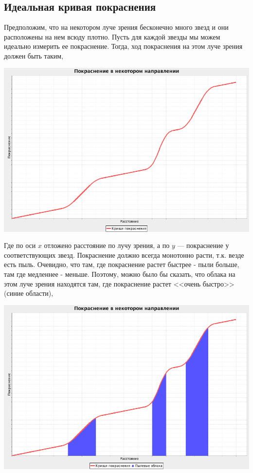 \documentclass[14pt]{article}
\begin{document}
        \subsection{Идеальная кривая покраснения}
            Предположим, что на некотором луче зрения бесконечно много звезд и они расположены на нем всюду плотно. Пусть для каждой звезды мы можем идеально измерить ее покраснение. Тогда, ход покраснения на этом луче зрения должен быть таким,
                
            \begin{center}
                \includegraphics[scale=0.3]{../../presentation/ideal-1-no-tick.png}
            \end{center}        		
                
            Где по оси $x$ отложено расстояние по лучу зрения, а по $y$ --- покраснение у соответствующих звезд. Покраснение должно всегда монотонно расти, т.к. везде есть пыль.  Очевидно, что там, где покраснение растет быстрее - пыли больше, там где медленнее - меньше. Поэтому, можно было бы сказать, что облака на этом луче зрения находятся там, где покраснение растет <<очень быстро>> (синие области),   
           
            \begin{center}
                \includegraphics[scale=0.3]{../../presentation/ideal-2-no-tick.png}    
            \end{center}        
        
\end{document}
